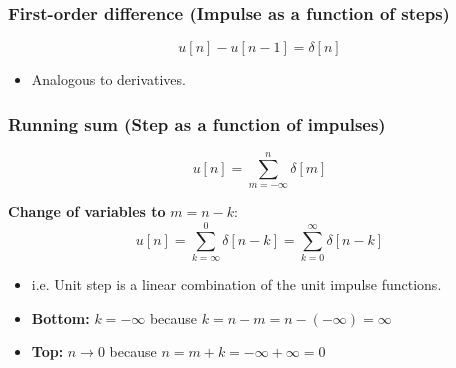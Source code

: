     \subsubsection{First-order difference (Impulse as a function of steps)}
    \begin{definition}
        \begin{equation}
            u[n] - u[n-1] = \delta [n]
        \end{equation}
        \begin{itemize}
            \item Analogous to derivatives.
        \end{itemize}
    \end{definition}

    \subsubsection{Running sum (Step as a function of impulses)}
    \begin{definition}
        \begin{equation}
            u[n] = \sum_{m=-\infty}^{n} \delta[m] 
        \end{equation}


        \noindent \textbf{Change of variables to} \(m = n - k \):
        \begin{equation}
            u[n] = \sum_{k=\infty}^{0} \delta[n-k] = \sum_{k=0}^{\infty} \delta[n-k]
        \end{equation}

        \begin{itemize}
            \item i.e. Unit step is a linear combination of the unit impulse functions.
            \item \textbf{Bottom:} $k=-\infty$ because $k = n - m = n - (-\infty) = \infty$
            \item \textbf{Top:} $n \rightarrow 0$ because $n = m + k = -\infty + \infty = 0$
        \end{itemize}

    \end{definition}

